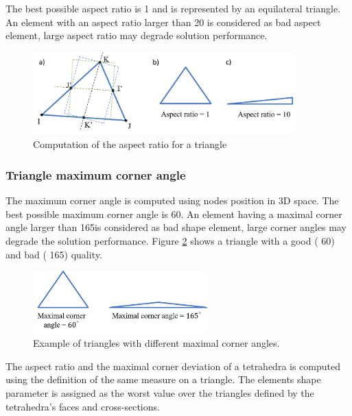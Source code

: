  The best possible aspect ratio is 1 and is represented by an equilateral triangle. An element with an aspect ratio larger than 20 is considered as bad aspect element, large aspect ratio may degrade solution performance.
 
 \begin{figure}[!h]
\centering
\includegraphics[width=0.9\textwidth,keepaspectratio]{figures/aspectRatio.png} 
\caption{Computation of the aspect ratio for a triangle}
\label{fig:aspectratio}
\end{figure}  

\subsubsection*{Triangle maximum corner angle}
The maximum corner angle is computed using nodes position in 3D space. The best possible maximum corner angle is 60\textdegree. An element having a maximal corner angle larger than 165\textdegree is considered as bad shape element, large corner angles may degrade the solution performance. Figure \ref{fig:cornerangle} shows a triangle with a good ( 60\textdegree) and bad ( 165\textdegree) quality. 

 \begin{figure}[!h]
\centering
\includegraphics[width=0.6\textwidth,keepaspectratio]{figures/maximalcornerangle.png} 
\caption{Example of triangles with different maximal corner angles.}
\label{fig:cornerangle}
\end{figure} 

The aspect ratio and the maximal corner deviation of a tetrahedra is computed using the definition of the same measure on a triangle. The elements shape parameter is assigned as the worst value over the triangles defined by the tetrahedra's faces and cross-sections.  

